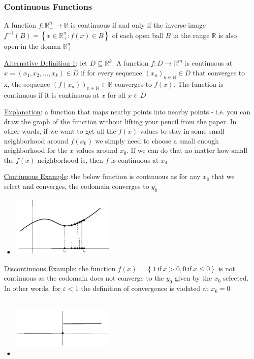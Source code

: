 \documentclass{article}
\begin{document}
\subsubsection{Continuous Functions}
A function $f: \mathbb{R}_{+}^{n} \rightarrow \mathbb{R}$ is continuous if and only if the inverse image $f^{-1} (B) = \left\{ x \in \mathbb{R}_{+}^{n}: f(x) \in B \right\}$ of each open ball $B$ in the range $\mathbb{R}$ is also open in the doman $\mathbb{R}_{+}^{n}$ \par \vspace{0.3em}
  \underline{Alternative Definition 1}: let $D \subseteq \mathbb{R}^{k}$. A function $f: D \rightarrow \mathbb{R}^{m}$ is continuous at $x = (x_{1}, x_{2}, \dots, x_{k}) \in D$ if for every sequence $(x_{n})_{n \in \mathbb{N}} \in D$ that converges to x, the sequence $(f(x_{n}))_{n\in \mathbb{N}} \in \mathbb{R}$ converges to $f(x)$. The function is continuous if it is continuous at $x$ for all $x \in D$ \par
  \underline{Explanation}: a function that maps nearby points into nearby points - i.e. you can draw the graph of the function without lifting your pencil from the paper. In other words, if we want to get all the $f(x)$ values to stay in some small neighborhood around $f(x_{0})$ we simply need to choose a small enough neighborhood for the $x$ values around $x_{0}$. If we can do that no matter how small the $f(x)$ neighborhood is, then $f$ is continuous at $x_{0}$ \par
  \underline{Continuous Example}: the below function is continuous as for any $x_{0}$ that we select and converges, the codomain converges to $y_{0}$
  \begin{itemize}
    \item  \includegraphics[width=5cm, height=3cm]{pic6}
  \end{itemize}
  \par
  \underline{Discontinuous Example}: the function $f(x) = \left\{ 1 \ \text{if} \ x > 0, 0 \ \text{if} \ x \leq 0 \right\}$ is not continuous as the codomain does not converge to the $y_{0}$ given by the $x_{0}$ selected. In other words, for $\varepsilon < 1$ the definition of convergence is violated at $x_{0} = 0$
  \begin{itemize}
    \item  \includegraphics[width=5cm, height=3cm]{pic7}
  \end{itemize}
\end{document}
